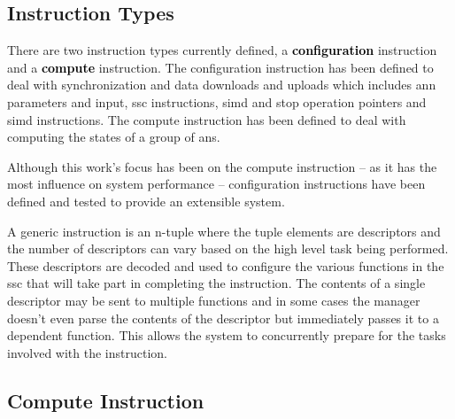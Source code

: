 \subsection{Instruction Types}
\label{sec:Instruction Types}
There are two instruction types currently defined, a \textbf{{\textcolor{black}{configuration}}} instruction and a \textbf{\textcolor{black}{compute}} instruction.
The configuration instruction has been defined to deal with synchronization and data downloads and uploads which includes \ac{ann} parameters and input, \ac{ssc} instructions, \ac{simd} and \ac{stop} operation pointers and \ac{simd} instructions.
The compute instruction has been defined to deal with computing the states of a group of \acp{an}. \par
Although this work's focus has been on the compute instruction -- as it has the most influence on system performance -- configuration instructions have been defined and tested to provide an extensible system.
\iffalse
\begin{outline}
  \lbbcleanspace
   \1 \ac{ann} parameters and input
   \1 \ac{ssc} instructions
   \1 \ac{simd} and \ac{stop} operation pointers
   \1 \ac{simd} instructions
\end{outline}
Typically an instruction contains information to process a group of \acp{an} but there are other instruction types to synchronize.
A group can be anywhere from one to 32 \acp{an} and is based on the number of execution lanes in the \ac{ssc} (see Section \ref{sec:Processing a group of ANes}) and how the user partitions the \ac{ann} across the available \acp{ssc}.
\fi

A generic instruction is an n-tuple where the tuple elements are descriptors and the number of descriptors can vary based on the high level task being performed. 
These descriptors are decoded and used to configure the various functions in the \ac{ssc} that will take part in completing the instruction. 
The contents of a single descriptor may be sent to multiple functions and in some cases the manager doesn't even parse the contents of the descriptor but immediately passes it to a dependent function.
This allows the system to concurrently prepare for the tasks involved with the instruction.


\subsection{Compute Instruction}
\label{sec:Compute Instruction}

